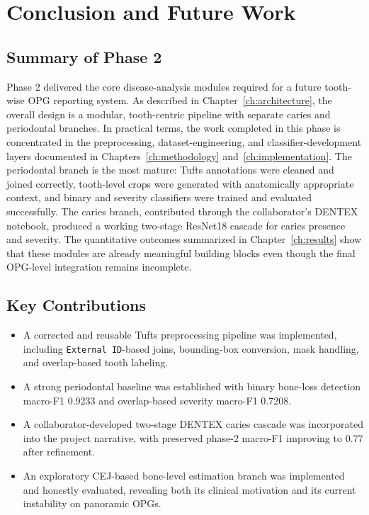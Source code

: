 
\chapter{Conclusion and Future Work}
\label{ch:conclusion}

\section{Summary of Phase 2}
\label{sec:concl-summary}

Phase 2 delivered the core disease-analysis modules required for a future
tooth-wise OPG reporting system. As described in
Chapter~\ref{ch:architecture}, the overall design is a modular, tooth-centric
pipeline with separate caries and periodontal branches. In practical terms, the
work completed in this phase is concentrated in the preprocessing,
dataset-engineering, and classifier-development layers documented in
Chapters~\ref{ch:methodology} and~\ref{ch:implementation}. The periodontal
branch is the most mature: Tufts annotations were cleaned and joined correctly,
tooth-level crops were generated with anatomically appropriate context, and
binary and severity classifiers were trained and evaluated successfully. The
caries branch, contributed through the collaborator's DENTEX notebook, produced
a working two-stage ResNet18 cascade for caries presence and severity. The
quantitative outcomes summarized in Chapter~\ref{ch:results} show that these
modules are already meaningful building blocks even though the final OPG-level
integration remains incomplete.

\section{Key Contributions}
\label{sec:concl-contributions}

\begin{itemize}
  \item A corrected and reusable Tufts preprocessing pipeline was implemented, including \texttt{External ID}-based joins, bounding-box conversion, mask handling, and overlap-based tooth labeling.
  \item A strong periodontal baseline was established with binary bone-loss detection macro-F1 0.9233 and overlap-based severity macro-F1 0.7208.
  \item A collaborator-developed two-stage DENTEX caries cascade was incorporated into the project narrative, with preserved phase-2 macro-F1 improving to 0.77 after refinement.
  \item An exploratory CEJ-based bone-level estimation branch was implemented and honestly evaluated, revealing both its clinical motivation and its current instability on panoramic OPGs.
\end{itemize}


